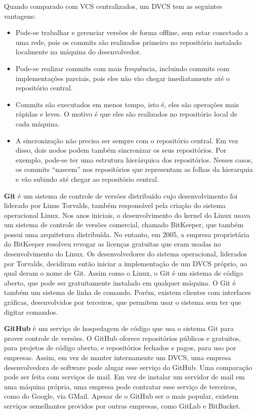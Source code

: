 \documentclass[
  11pt,
  twoside]{book}
\begin{document}
Quando comparado com VCS centralizados, um DVCS tem as seguintes
vantagens:

\begin{itemize}
\item
  Pode-se trabalhar e gerenciar versões de forma offline, sem estar
  conectado a uma rede, pois os commits são realizados primeiro no
  repositório instalado localmente na máquina do desenvolvedor.
\item
  Pode-se realizar commits com mais frequência, incluindo commits com
  implementações parciais, pois eles não vão chegar imediatamente até o
  repositório central.
\item
  Commits são executados em menos tempo, isto é, eles são operações mais
  rápidas e leves. O motivo é que eles são realizados no repositório
  local de cada máquina.
\item
  A sincronização não precisa ser sempre com o repositório central. Em
  vez disso, dois nodos podem também sincronizar os seus repositórios.
  Por exemplo, pode-se ter uma estrutura hierárquica dos repositórios.
  Nesses casos, os commits ``nascem'' nos repositórios que representam
  as folhas da hierarquia e vão subindo até chegar ao repositório
  central.
\end{itemize}

   \textbf{Git} é um
sistema de controle de versões distribuído cujo desenvolvimento foi
liderado por Linus Torvalds, também responsável pela criação do sistema
operacional Linux. Nos anos iniciais, o desenvolvimento do kernel do
Linux usava um sistema de controle de versões comercial, chamado
BitKeeper, que também possui uma arquitetura distribuída. No entanto, em
2005, a empresa proprietária do BitKeeper resolveu revogar as licenças
gratuitas que eram usadas no desenvolvimento do Linux. Os
desenvolvedores do sistema operacional, liderados por Torvalds,
decidiram então iniciar a implementação de um DVCS próprio, ao qual
deram o nome de Git. Assim como o Linux, o Git é um sistema de código
aberto, que pode ser gratuitamente instalado em qualquer máquina. O Git
é também um sistema de linha de comando. Porém, existem clientes com
interfaces gráficas, desenvolvidos por terceiros, que permitem usar o
sistema sem ter que digitar comandos.

 \textbf{GitHub} é um serviço de hospedagem de código que
usa o sistema Git para prover controle de versões. O GitHub oferece
repositórios públicos e gratuitos, para projetos de código aberto, e
repositórios fechados e pagos, para uso por empresas. Assim, em vez de
manter internamente um DVCS, uma empresa desenvolvedora de software pode
alugar esse serviço do GitHub. Uma comparação pode ser feita com
serviços de mail. Em vez de instalar um servidor de mail em uma máquina
própria, uma empresa pode contratar esse serviço de terceiros, como do
Google, via GMail. Apesar de o GitHub ser o mais popular, existem
serviços semelhantes providos por outras empresas, como GitLab e
BitBucket.
\end{document}
